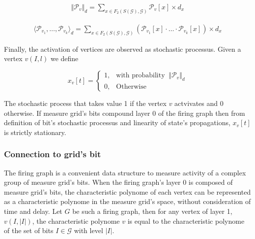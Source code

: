 \documentclass[a4paper, 11pt]{article}
\begin{document}
\vspace{10px}\begin{minipage}{.3\linewidth}
\begin{align*}
\Vert \mathcal{P}_v \Vert_{d} = \sum_{x \in F_2(S(\mathcal{G}), \mathcal{G})} \mathcal{P}_v\left[ x \right] \times d_x
\end{align*}
\end{minipage}%
\noindent\begin{minipage}{.7\linewidth}
\begin{align*}
\langle \mathcal{P}_{v_1}, \ldots,  \mathcal{P}_{v_k} \rangle_{d} = \sum_{x \in F_2(S(\mathcal{G}), \mathcal{G})} \left( \mathcal{P}_{v_1} \left[ x \right] \cdot \ldots \cdot \mathcal{P}_{v_k} \left[ x \right] \right) \times d_x
\end{align*}
\end{minipage}\vspace{15px}


Finally, the activation of vertices are observed as stochastic processus. Given a vertex $v(I, l)$ we define

\begin{equation*}
x_v[t] = \begin{cases} 1, & \text{with probability }\ \Vert \mathcal{P}_v \Vert_{d}\\ 0, & \text{Otherwise} \end{cases}
\end{equation*}

The stochastic process that takes value 1 if the vertex $v$ actvivates and 0 otherwise. If measure grid's bits compound layer 0 of the firing graph then from definition of bit's stochastic processus and linearity of state's propagations, $x_v[t]$ is strictly stationary.


\subsubsection*{Connection to grid's bit}

The firing graph is a convenient data structure to measure activity of a complex group of measure grid's bits. When the firing graph's layer 0 is composed of measure grid's bits, the characteristic polynome of each vertex can be represented as a characteristic polynome in the measure grid's space, without consideration of time and delay. Let $G$ be such a firing graph, then for any vertex of layer 1, $v(I, \vert I \vert)$, the characteristic polynome $v$ is equal to the characteristic polynome of the set of bits $I \in \mathcal{G}$ with level $\vert I \vert$.
\end{document}
